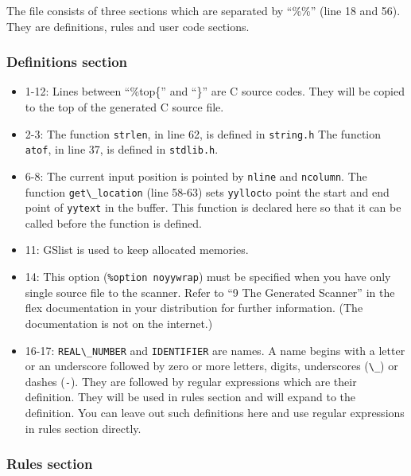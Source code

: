 The file consists of three sections which are separated by ``\%\%''
(line 18 and 56). They are definitions, rules and user code sections.

\hypertarget{definitions-section}{%
\subsubsection{Definitions section}\label{definitions-section}}

\begin{itemize}
\tightlist
\item
  1-12: Lines between ``\%top\{'' and ``\}'' are C source codes. They
  will be copied to the top of the generated C source file.
\item
  2-3: The function \passthrough{\lstinline!strlen!}, in line 62, is
  defined in \passthrough{\lstinline!string.h!} The function
  \passthrough{\lstinline!atof!}, in line 37, is defined in
  \passthrough{\lstinline!stdlib.h!}.
\item
  6-8: The current input position is pointed by
  \passthrough{\lstinline!nline!} and \passthrough{\lstinline!ncolumn!}.
  The function \passthrough{\lstinline!get\_location!} (line 58-63) sets
  \passthrough{\lstinline!yylloc!}to point the start and end point of
  \passthrough{\lstinline!yytext!} in the buffer. This function is
  declared here so that it can be called before the function is defined.
\item
  11: GSlist is used to keep allocated memories.
\item
  14: This option (\passthrough{\lstinline!\%option noyywrap!}) must be
  specified when you have only single source file to the scanner. Refer
  to ``9 The Generated Scanner'' in the flex documentation in your
  distribution for further information. (The documentation is not on the
  internet.)
\item
  16-17: \passthrough{\lstinline!REAL\_NUMBER!} and
  \passthrough{\lstinline!IDENTIFIER!} are names. A name begins with a
  letter or an underscore followed by zero or more letters, digits,
  underscores (\passthrough{\lstinline!\_!}) or dashes
  (\passthrough{\lstinline!-!}). They are followed by regular
  expressions which are their definition. They will be used in rules
  section and will expand to the definition. You can leave out such
  definitions here and use regular expressions in rules section
  directly.
\end{itemize}

\hypertarget{rules-section}{%
\subsubsection{Rules section}\label{rules-section}}

